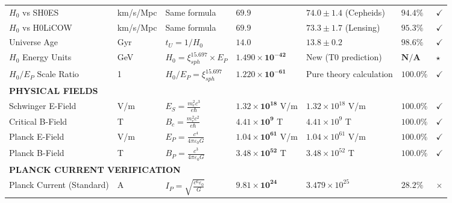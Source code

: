 \documentclass[12pt,a4paper]{article}
\begin{document}
\begin{landscape}
\begin{longtable}{p{5.5cm}p{1.8cm}p{4cm}p{3.5cm}p{3.5cm}p{1.8cm}p{1cm}}
			$H_0$ vs SH0ES & km/s/Mpc & Same formula & $\mathbf{69.9}$ & $74.0 \pm 1.4$ (Cepheids) & $\mathbf{94.4\%}$ & $\checkmark$ \\
			
			$H_0$ vs H0LiCOW & km/s/Mpc & Same formula & $\mathbf{69.9}$ & $73.3 \pm 1.7$ (Lensing) & $\mathbf{95.3\%}$ & $\checkmark$ \\
			
			Universe Age & Gyr & $t_U = 1/H_0$ & $\mathbf{14.0}$ & $13.8 \pm 0.2$ & $\mathbf{98.6\%}$ & $\checkmark$ \\
			
			$H_0$ Energy Units & GeV & $H_0 = \xi_{sph}^{15.697} \times E_P$ & $\mathbf{1.490 \times 10^{-42}}$ & New (T0 prediction) & $\mathbf{N/A}$ & $\star$ \\
			
			$H_0/E_P$ Scale Ratio & 1 & $H_0/E_P = \xi_{sph}^{15.697}$ & $\mathbf{1.220 \times 10^{-61}}$ & Pure theory calculation & $\mathbf{100.0\%}$ & $\checkmark$ \\
			
			\multicolumn{7}{l}{\textbf{PHYSICAL FIELDS}} \\
			\midrule
			Schwinger E-Field & V/m & $E_S = \frac{m_e^2 c^3}{e\hbar}$ & $\mathbf{1.32 \times 10^{18}}$ V/m & $1.32 \times 10^{18}$ V/m & $\mathbf{100.0\%}$ & $\checkmark$ \\
			
			Critical B-Field & T & $B_c = \frac{m_e^2 c^2}{e\hbar}$ & $\mathbf{4.41 \times 10^{9}}$ T & $4.41 \times 10^{9}$ T & $\mathbf{100.0\%}$ & $\checkmark$ \\
			
			Planck E-Field & V/m & $E_P = \frac{c^4}{4\pi\varepsilon_0 G}$ & $\mathbf{1.04 \times 10^{61}}$ V/m & $1.04 \times 10^{61}$ V/m & $\mathbf{100.0\%}$ & $\checkmark$ \\
			
			Planck B-Field & T & $B_P = \frac{c^3}{4\pi\varepsilon_0 G}$ & $\mathbf{3.48 \times 10^{52}}$ T & $3.48 \times 10^{52}$ T & $\mathbf{100.0\%}$ & $\checkmark$ \\
			
			\multicolumn{7}{l}{\textbf{PLANCK CURRENT VERIFICATION}} \\
			\midrule
			Planck Current (Standard) & A & $I_P = \sqrt{\frac{c^6\varepsilon_0}{G}}$ & $\mathbf{9.81 \times 10^{24}}$ & $3.479 \times 10^{25}$ & $\mathbf{28.2\%}$ & $\times$ \\
			

\end{longtable}
\end{landscape}
\end{document}
